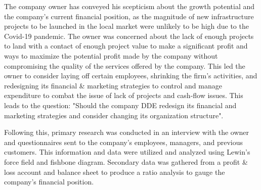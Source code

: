 
{The company owner has conveyed his scepticism about the growth potential and the company's current financial position, as the magnitude of new infrastructure projects to be launched in the local market were unlikely to be high due to the Covid-19 pandemic. The owner was concerned about the lack of enough projects to land with a contact of enough project value to make a significant profit and ways to maximize the potential profit made by the company without compromising the quality of the services offered by the company. This led the owner to consider laying off certain employees, shrinking the firm's activities, and redesigning its financial & marketing strategies to control and manage expenditure to combat the issue of lack of projects and cash-flow issues. This leads to the question: "Should the company DDE redesign its financial and marketing strategies and consider changing its organization structure".}

\vspace{0.25cm}

{Following this, primary research was conducted in an interview with the owner and questionnaires sent to the company's employees, managers, and previous customers. This information and data were utilized and analyzed using Lewin's force field and fishbone diagram. Secondary data was gathered from a profit & loss account and balance sheet to produce a ratio analysis to gauge the company's financial position.
}

\vspace{0.25cm}

{}

